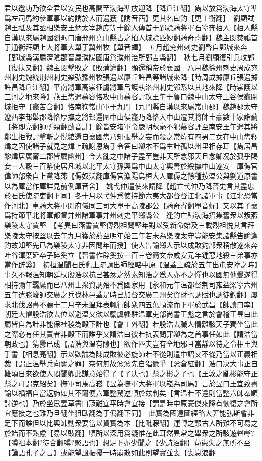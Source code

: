 君以邀功乃欲全君以安民也高開至渤海凖放迎降【降戶江翻】雋以放爲渤海太守凖爲左司馬約參軍事以約誘於人而遇獲【誘音酉】更其名曰釣【更工衡翻】　劉顯弑趙王祗及其丞相樂安王炳太宰趙庶等十餘人傳首于鄴驃騎將軍石寜奔栢人【栢人縣自漢以來屬趙國劉昫曰唐邢州堯山縣古之柏人城驃匹妙翻騎奇寄翻】魏主閔焚祗首于通衢拜顯上大將軍大單于冀州牧【單音蟬】　五月趙兖州刺史劉啓自鄄城來奔【鄄城縣漢屬濟隂郡晉屬濮陽國唐爲濮州治所鄄吉縣翻】　秋七月劉顯復引兵攻鄴【復扶又翻】魏主閔撃敗之【敗蒲邁翻】顯還稱帝於襄國　八月魏徐州刺史周成兖州刺史魏統荆州刺史樂弘豫州牧張遇以廪丘許昌等諸城來降【時周成據廪丘張遇據許昌降戶江翻】平南將軍高崇征虜將軍呂護執洛州刺史鄭系以其地來降【時崇護以三河之地來降】燕王雋遣慕容恪攻中山慕容評攻王午于魯口魏中山太守上谷侯龕閉城拒守【龕苦含翻】恪南狥常山軍于九門【九門縣自漢以來屬常山郡】魏趙郡太守遼西李邽舉郡降恪厚撫之將邽還圍中山侯龕乃降恪入中山遷其將帥土豪數十家詣薊【將即亮翻帥所類翻薊音計】餘皆安堵軍令嚴明秋毫不犯慕容評至南安王午遣其將鄭生拒戰評撃斬之悦綰還自襄國雋乃知張舉之妄而殺之常煒有四男二女在中山雋釋煒之囚使諸子就見之煒上疏謝恩雋手令答曰卿本不爲生計孤以州里相存耳【雋居昌黎煒居廣甯二郡皆屬幽州】今大亂之中諸子盡至豈非天所念邪天且念卿况於孤乎賜妾一人穀三百斛使居凡城以北平太守孫興爲中山太守興善於綏撫中山遂安　庫傉官偉帥部衆自上黨降燕【傉奴沃翻庫傉官漁陽烏桓大人庫傉之餘種按温公與劉道原書以為庫當作厙詳見前例厙音舍】　姚弋仲遣使來請降【趙亡弋仲乃降晉史言其盡忠於石氏使疏吏翻下同】冬十月以弋仲爲使持節六夷大都督督江北諸軍事【江北恐當作河北】車騎大將軍開府儀同三司大單于高陵郡公【騎奇寄翻單音蟬】又以其子襄爲持節平北將軍都督并州諸軍事并州刺史平鄉縣公　逢釣亡歸渤海招集舊衆以叛燕樂陵太守賈堅　【考異曰燕書賈堅傳烈祖問堅年對以受新命始及三載烈祖悦其言拜樂陵太守按堅以去年九月獲於燕至明年始三年若未為樂陵太守豈能安集諸縣告諭逢釣故知堅先已為樂陵太守非因問年而授】使人告諭鄉人示以成敗釣部衆稍散遂來奔　吐谷渾葉延卒子碎奚立【晉書作辟奚按一百三卷簡文帝咸安元年鍾惡地殺三弟事亦當作辟奚】　初桓温聞石氏亂上疏請出師經略中原【温蓋上疏於五年出屯安陸之時】事久不報温知朝廷杖殷浩以抗已甚忿之然素知浩之爲人亦不之憚也以國無他釁遂得相持彌年覊縻而已八州士衆資調殆不爲國家用【永和元年温都督荆司雍益梁寜六州五年遣滕峻帥交廣之兵伐林邑蓋是時已加督交廣二州矣資財也調賦也調徒釣翻】屢求北伐詔書不聼十二月辛未温拜表輒行帥衆四五萬順流而下軍於武昌【帥讀曰率】朝廷大懼殷浩欲去位以避温又欲以騶虞幡駐温軍吏部尚書王彪之言於會稽王昱曰此屬皆自為計非能保社稷為殿下計也【會工外翻】若殷浩去職人情離駭天子獨坐當此之際必有任其責者非殿下而誰乎又謂浩曰彼若抗表問罪卿為之首事任如此【謂浩當朝政也】猜釁已成【謂浩與温有隙也】欲作匹夫豈有全地邪且當靜以待之令相王與手書【相息亮翻】示以欵誠為陳成敗彼必旋師若不從則遣中詔又不從乃當以正義相裁【謂正温舉兵向闕之罪】奈何無故忩忩先自猖獗乎【忩倉紅翻】浩曰决大事正自難頃日來欲使人悶聞卿此謀意始得了【了决也】彪之彬之子也【王敦之亂彬能守正彪之可謂克紹矣】撫軍司馬高崧【昱為撫軍大將軍以崧為司馬】言於昱曰王宜致書諭以禍福自當返斾如其不爾便六軍整駕逆順於兹判矣【言温若不還則當整六師奉順討逆也】乃於坐爲昱草書曰宼難宜平時會宜接【謂是時中原豪傑來降有恢復之會所宜應接之也難乃旦翻坐狙臥翻為于僞翻下同】　此實為國遠圖經略大筭能弘斯會非足下而誰但以比興師動衆要當以資實為本【比毗寐翻】運轉之艱古人所難不可易之於始而不熟慮【易以䜴翻】頃所以深用爲疑惟在此耳然異常之舉衆之所駭遊聲噂?【噂祖本翻?徒合翻噂?聚語也】想足下亦少聞之【少詩沼翻】苟患失之無所不至【論語孔子之言】或能望風振擾一時崩散如此則望實並喪【喪息浪翻